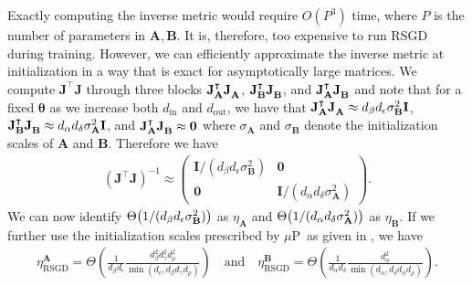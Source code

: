 \documentclass{article}
\newcommand{\mbf}[1]{{\boldsymbol{\mathbf{#1}}}}
\newcommand{\bm}{\mbf}
\newcommand{\din}{{d_\mathrm{in}}}
\newcommand{\dout}{{d_\mathrm{out}}}
\newcommand{\mup}{$\mu$P}
\renewcommand{\order}[1]{\Theta\qty(#1)}
\begin{document}
Exactly computing the inverse metric would require $O(P^3)$ time, where $P$ is the number of parameters in $\bm{A},\bm{B}$. It is, therefore, too expensive to run RSGD during training. However, we can efficiently approximate the inverse metric at initialization in a way that is exact for asymptotically large matrices.
We compute $\bm{J}^{\intercal}\bm{J}$ through three blocks $\bm{J}_{\bm{A}}^{\intercal} \bm{J}^{\vphantom{\intercal}}_{\bm{A}}$,
$\bm{J}^{\intercal}_{\bm{B}} \bm{J}^{\vphantom{\intercal}}_{\bm{B}}$, and $\bm{J}_{\bm{A}}^{\intercal} \bm{J}^{\vphantom{\intercal}}_{\bm{B}}$
and note that for a fixed $\bm{\theta}$ as we increase both $\din$ and $\dout$, we have that
$\bm{J}_{\bm{A}}^{\intercal} \bm{J}^{\vphantom{\intercal}}_{\bm{A}} \approx d_{\beta} d_{\epsilon} \sigma_{\bm{B}}^{2} \bm{I}$,
$\bm{J}_{\bm{B}}^{\intercal} \bm{J}^{\vphantom{\intercal}}_{\bm{B}} \approx d_{\alpha} d_{\delta} \sigma_{\bm{A}}^{2} \bm{I}$,
and
$\bm{J}_{\bm{A}}^{\intercal} \bm{J}^{\vphantom{\intercal}}_{\bm{B}} \approx \bm{0}$ where $\sigma_{\bm{A}}$ and $\sigma_{\bm{B}}$ denote the initialization
scales of $\bm{A}$ and $\bm{B}$.
Therefore we have
\begin{equation*}
    \begin{split}
      (\bm{J}^{\intercal} \bm{J})^{-1}
      \approx
      \begin{pmatrix}
        \bm{I} / (d_{\beta} d_{\epsilon} \sigma_{\bm{B}}^{2})
        &
        \bm{0}
        \\
        \bm{0} &
        \bm{I} / (d_{\alpha} d_{\delta} \sigma_{\bm{A}}^{2})
      \end{pmatrix}
      .
    \end{split}
\end{equation*}
We can now identify $\order{1/ (d_{\beta} d_{\epsilon} \sigma_{\bm{B}}^{2})}$ as $\eta_\bm{A}$ and $\order{1 / (d_{\alpha} d_{\delta} \sigma_{\bm{A}}^{2})}$ as $\eta_\bm{B}.$ If we further use the initialization scales prescribed by \mup\ as given in , we have
\begin{equation*}
    \begin{split}
      \eta^{\bm{A}}_{\text{RSGD}}
      =
      \Theta\left(\frac{1}{d_{\beta} d_{\epsilon}} \frac{d_{\beta}^{2} d_{\gamma}^{2} d_{\rho}^{2}}{\min(d_{\epsilon}, d_{\beta} d_{\gamma} d_{\rho})}\right)
      \quad \text{and} \quad
      \eta^{\bm{B}}_{\text{RSGD}}
      =
      \Theta\left(\frac{1}{d_{\alpha} d_{\delta}} \frac{d_{\alpha}^{2}}{\min(d_{\alpha}, d_{\delta} d_{\phi} d_{\rho})}\right).
    \end{split}
\end{equation*}
\end{document}
